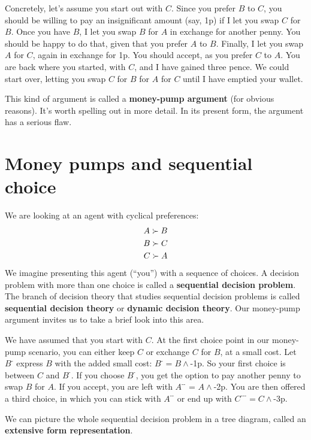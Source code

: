Concretely, let's assume you start out with $C$. Since you prefer $B$ to $C$,
you should be willing to pay an insignificant amount (say, 1p) if I let you swap
$C$ for $B$. Once you have $B$, I let you swap $B$ for $A$ in exchange for
another penny. You should be happy to do that, given that you prefer $A$ to $B$.
Finally, I let you swap $A$ for $C$, again in exchange for 1p. You should
accept, as you prefer $C$ to $A$. You are back where you started, with $C$, and
I have gained three pence. We could start over, letting you swap $C$ for $B$ for
$A$ for $C$ until I have emptied your wallet.

This kind of argument is called a \textbf{money-pump argument} (for obvious
reasons). It's worth spelling out in more detail. In its present form, the
argument has a serious flaw.

\section{Money pumps and sequential choice}\label{sec:sequentialchoice}

We are looking at an agent with cyclical preferences:
\begin{gather*}
  A \succ B\\
  B \succ C\\
  C \succ A
\end{gather*}
We imagine presenting this agent (``you'') with a sequence of choices. A
decision problem with more than one choice is called a \textbf{sequential
  decision problem}. The branch of decision theory that studies sequential
decision problems is called \textbf{sequential decision theory} or
\textbf{dynamic decision theory}. Our money-pump argument invites us to take a
brief look into this area.

We have assumed that you start with $C$. At the first choice point in our
money-pump scenario, you can either keep $C$ or exchange $C$ for $B$, at a small
cost. Let $B^{\text{-}}$ express $B$ with the added small cost:
$B^{\text{-}} = B \land $-1p. So your first choice is between $C$ and
$B^{\text{-}}$. If you choose $B^{\text{-}}$, you get the option to pay another
penny to swap $B$ for $A$. If you accept, you are left with
$A^{\text{-}\text{-}}$ = $A \land$-2p. You are then offered a third choice, in
which you can stick with $A^{\text{-}\text{-}}$ or end up with
$C^{\text{-}\text{-}\text{-}} = C \land$-3p.

We can picture the whole sequential decision problem in a tree diagram, called
an \textbf{extensive form representation}.


